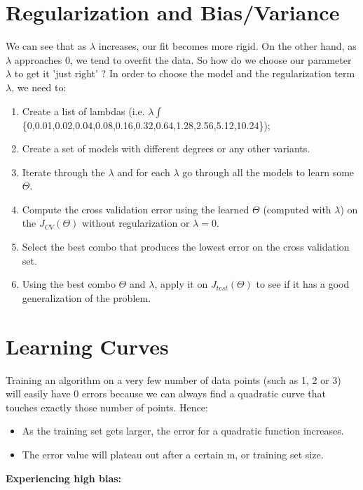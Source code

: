 \section{Regularization and Bias/Variance}

We can see that as $ \lambda $ increases, our fit becomes more rigid. On the other hand, as $ \lambda $ approaches 0, we tend to overfit the data. So how do we choose our parameter $ \lambda $ to get it 'just right' ? In order to choose the model and the regularization term $ \lambda $, we need to:\\

\begin{enumerate}
\item Create a list of lambdas (i.e. $ \lambda \int $ \{0,0.01,0.02,0.04,0.08,0.16,0.32,0.64,1.28,2.56,5.12,10.24\});
\item Create a set of models with different degrees or any other variants.
\item Iterate through the $ \lambda $ and for each $ \lambda $ go through all the models to learn some $\Theta$.
\item Compute the cross validation error using the learned $\Theta$ (computed with $\lambda$) on the $J_{CV}(\Theta)$ without regularization or $ \lambda = 0$.
\item Select the best combo that produces the lowest error on the cross validation set.
\item Using the best combo $\Theta$ and $ \lambda $, apply it on $J_{test}(\Theta)$ to see if it has a good generalization of the problem.
\end{enumerate}


\section{Learning Curves}

Training an algorithm on a very few number of data points (such as 1, 2 or 3) will easily have 0 errors because we can always find a quadratic curve that touches exactly those number of points. Hence:

\begin{itemize}
\item As the training set gets larger, the error for a quadratic function increases.
\item The error value will plateau out after a certain m, or training set size.
\end{itemize}

\textbf{Experiencing high bias:}\\

